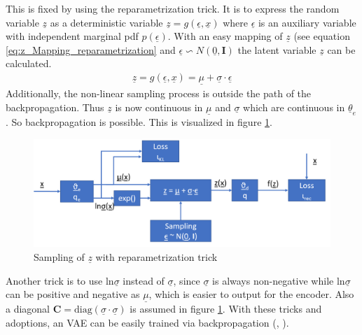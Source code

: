 \documentclass[12pt,DIV14,BCOR12mm,a4paper,footexclude,headinclude,halfparskip-,twoside,openright,openany,cleardoubleempty,idxtotoc,bibtotoc]{scrreprt} %
\numberwithin{equation}{chapter}
\begin{document}
This is fixed by using the reparametrization trick. It is to express the random variable $\underline{z}$ as a deterministic variable $\underline{z} = g(\underline{\epsilon}, \underline{x})$ where $\underline{\epsilon}$ is an auxiliary variable with independent marginal pdf $p(\underline{\epsilon})$. With an easy mapping of $\underline{z}$ (see equation \ref{eq:z_Mapping_reparametrization} and $\underline{\epsilon} \backsim N(\underline{0}, \mathbf{I})$ the latent variable $\underline{z}$ can be calculated.
\begin{align}
	\underline{z} = g(\underline{\epsilon}, \underline{x}) = \underline{\mu} + \underline{\sigma}\cdot\underline{\epsilon}\label{eq:z_Mapping_reparametrization}
\end{align}
Additionally, the non-linear sampling process is outside the path of the backpropagation. Thus $\underline{z}$ is now continuous in $\underline{\mu}$ and $\underline{\sigma}$ which are continuous in $\underline{\theta}_e$. So backpropagation is possible. This is visualized in figure \ref{fig:Sampling_w_reparametrization}.
\begin{figure}[htb!]
	\centering
	\includegraphics[width=0.75\linewidth]{Graphiken/VAE_w_reparametrization}
	\caption{Sampling of $\underline{z}$ with reparametrization trick}
	\label{fig:Sampling_w_reparametrization}
\end{figure}
Another trick is to use $\textrm{ln}\underline{\sigma}$ instead of $\underline{\sigma}$, since $\underline{\sigma}$ is always non-negative while $\textrm{ln}\underline{\sigma}$ can be positive and negative as $\underline{\mu}$, which is easier to output for the encoder. Also a diagonal $\mathbf{C} = \textrm{diag}(\underline{\sigma}\cdot\underline{\sigma})$ is assumed in figure \ref{fig:Sampling_w_reparametrization}. With these tricks and adoptions, an VAE can be easily trained via backpropagation (\cite{Kingma14VAE}, \cite{LectureNotes_DeepLearning}).
\end{document}
